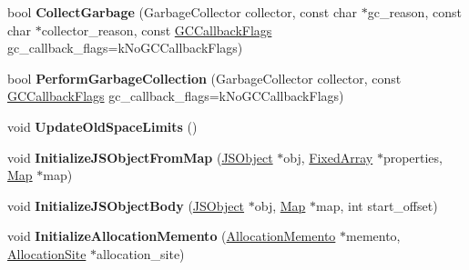 \begin{DoxyCompactItemize}
\item 
bool {\bfseries Collect\+Garbage} (Garbage\+Collector collector, const char $\ast$gc\+\_\+reason, const char $\ast$collector\+\_\+reason, const \hyperlink{namespacev8_a247c37a849f4d6c293b9b16e94e1944b}{G\+C\+Callback\+Flags} gc\+\_\+callback\+\_\+flags=k\+No\+G\+C\+Callback\+Flags)\hypertarget{classv8_1_1internal_1_1_heap_a9e3e8c04310c16de410a9ad2e1139582}{}\label{classv8_1_1internal_1_1_heap_a9e3e8c04310c16de410a9ad2e1139582}

\item 
bool {\bfseries Perform\+Garbage\+Collection} (Garbage\+Collector collector, const \hyperlink{namespacev8_a247c37a849f4d6c293b9b16e94e1944b}{G\+C\+Callback\+Flags} gc\+\_\+callback\+\_\+flags=k\+No\+G\+C\+Callback\+Flags)\hypertarget{classv8_1_1internal_1_1_heap_a5eb4307248dd280ecb834e119bbb3290}{}\label{classv8_1_1internal_1_1_heap_a5eb4307248dd280ecb834e119bbb3290}

\item 
void {\bfseries Update\+Old\+Space\+Limits} ()\hypertarget{classv8_1_1internal_1_1_heap_a7c1b9bbd7a78df3e56b2e03b621919dd}{}\label{classv8_1_1internal_1_1_heap_a7c1b9bbd7a78df3e56b2e03b621919dd}

\item 
void {\bfseries Initialize\+J\+S\+Object\+From\+Map} (\hyperlink{classv8_1_1internal_1_1_j_s_object}{J\+S\+Object} $\ast$obj, \hyperlink{classv8_1_1internal_1_1_fixed_array}{Fixed\+Array} $\ast$properties, \hyperlink{classv8_1_1internal_1_1_map}{Map} $\ast$map)\hypertarget{classv8_1_1internal_1_1_heap_a39bb6c80bb51887e12b2f32364007efe}{}\label{classv8_1_1internal_1_1_heap_a39bb6c80bb51887e12b2f32364007efe}

\item 
void {\bfseries Initialize\+J\+S\+Object\+Body} (\hyperlink{classv8_1_1internal_1_1_j_s_object}{J\+S\+Object} $\ast$obj, \hyperlink{classv8_1_1internal_1_1_map}{Map} $\ast$map, int start\+\_\+offset)\hypertarget{classv8_1_1internal_1_1_heap_a0a799ec78ff4d32b8cab4e1acbccd894}{}\label{classv8_1_1internal_1_1_heap_a0a799ec78ff4d32b8cab4e1acbccd894}

\item 
void {\bfseries Initialize\+Allocation\+Memento} (\hyperlink{classv8_1_1internal_1_1_allocation_memento}{Allocation\+Memento} $\ast$memento, \hyperlink{classv8_1_1internal_1_1_allocation_site}{Allocation\+Site} $\ast$allocation\+\_\+site)\hypertarget{classv8_1_1internal_1_1_heap_a68d35dac2d196a55512da24985db3edc}{}\label{classv8_1_1internal_1_1_heap_a68d35dac2d196a55512da24985db3edc}


\end{DoxyCompactItemize}
